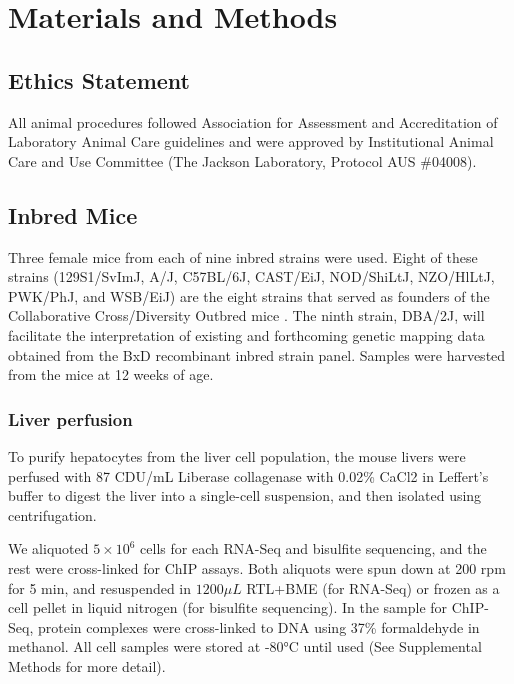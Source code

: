 \documentclass[
  11pt,
]{article}
\begin{document}
\hypertarget{materials-and-methods}{%
\section{Materials and Methods}\label{materials-and-methods}}

\hypertarget{ethics-statement}{%
\subsection{Ethics Statement}\label{ethics-statement}}

All animal procedures followed Association for Assessment and
Accreditation of Laboratory Animal Care guidelines and were approved by
Institutional Animal Care and Use Committee (The Jackson Laboratory,
Protocol AUS \#04008).

\hypertarget{inbred-mice}{%
\subsection{Inbred Mice}\label{inbred-mice}}

Three female mice from each of nine inbred strains were used. Eight of
these strains (129S1/SvImJ, A/J, C57BL/6J, CAST/EiJ, NOD/ShiLtJ,
NZO/HlLtJ, PWK/PhJ, and WSB/EiJ) are the eight strains that served as
founders of the Collaborative Cross/Diversity Outbred mice
\citep{Chesler:2008ge}. The ninth strain, DBA/2J, will facilitate the
interpretation of existing and forthcoming genetic mapping data obtained
from the BxD recombinant inbred strain panel. Samples were harvested
from the mice at 12 weeks of age.

\hypertarget{liver-perfusion}{%
\subsubsection{Liver perfusion}\label{liver-perfusion}}

To purify hepatocytes from the liver cell population, the mouse livers
were perfused with 87 CDU/mL Liberase collagenase with 0.02\% CaCl2 in
Leffert's buffer to digest the liver into a single-cell suspension, and
then isolated using centrifugation.

We aliquoted \(5 \times 10^{6}\) cells for each RNA-Seq and bisulfite
sequencing, and the rest were cross-linked for ChIP assays. Both
aliquots were spun down at 200 rpm for 5 min, and resuspended in
\(1200\mu L\) RTL+BME (for RNA-Seq) or frozen as a cell pellet in liquid
nitrogen (for bisulfite sequencing). In the sample for ChIP-Seq, protein
complexes were cross-linked to DNA using 37\% formaldehyde in methanol.
All cell samples were stored at -80°C until used (See Supplemental
Methods for more detail).
\end{document}
